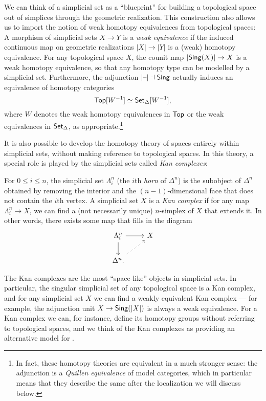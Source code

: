 \documentclass[a4paper,11pt]{article}
\renewcommand{\Top}{\catname{Top}}
\begin{document}
We can think of a simplicial set as a ``blueprint'' for building a
topological space out of simplices through the geometric
realization. This construction also allows us to import the notion of
weak homotopy equivalences from topological spaces: A morphism of
simplicial sets $X \to Y$ is a \emph{weak equivalence} if the induced
continuous map on geometric realizations $|X| \to |Y|$ is a (weak)
homotopy equivalence. For any topological space $X$, the counit map
$|\Sing(X)| \to X$ is a weak homotopy equivalence, so that any
homotopy type can be modelled by a simplicial set. Furthermore, the
adjunction $|\text{\textendash}| \dashv \textup{\textsf{Sing}}$ actually induces an equivalence of homotopy
categories
\[ \Top[W^{-1}] \simeq \sSet[W^{-1}],\] where $W$ denotes the weak
homotopy equivalences in $\Top$ or the weak equivalences in $\textup{\textsf{Set}}_{\Delta}$,
as appropriate.\footnote{In fact, these homotopy theories are equivalent
  in a much stronger sense: the adjunction is a \emph{Quillen
    equivalence} of model categories, which in particular means that
  they describe the same \icat{} after the \icatl{} localization we
  will discuss below.}

It is also possible to develop the homotopy theory of spaces entirely
within simplicial sets, without making reference to topological
spaces. In this theory, a special role is played by the simplicial
sets called \emph{Kan complexes}:
\begin{defn}
  For $0 \leq i \leq n$, the simplicial set $\Lambda^{n}_{i}$ (the
  $i$th \emph{horn} of $\Delta^{n}$) is the subobject of $\Delta^{n}$
  obtained by removing the interior and the $(n-1)$-dimensional face
  that does not contain the $i$th vertex. A simplicial set $X$ is a
  \emph{Kan complex} if for any map $\Lambda^{n}_{i} \to X$, we can
  find a (not necessarily unique) $n$-simplex of $X$ that extends
  it. In other words, there exists some map that fills in the diagram
  \[
    \begin{tikzcd}
      \Lambda^{n}_{i} \arrow{r} \arrow{d} & X \\
      \Delta^{n}. \arrow[dotted]{ur}
    \end{tikzcd}
  \]
\end{defn}
The Kan complexes are the most ``space-like''
objects in simplicial sets. In particular, the singular simplicial set of any topological space is a Kan complex,
and for any simplicial set $X$ we can find a weakly equivalent Kan
complex --- for example, the adjunction unit $X \to \Sing(|X|)$ is
always a weak equivalence. For a Kan complex we can, for instance,
define its homotopy groups without referring to topological spaces,
and we think of the Kan complexes as providing an alternative model
for \igpds{}.
\end{document}
